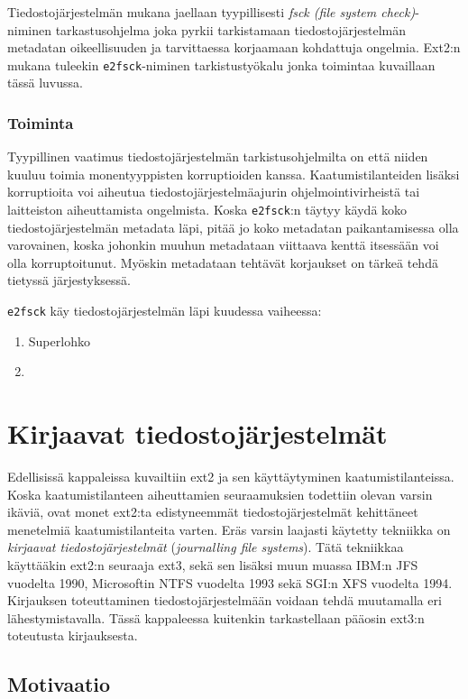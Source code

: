 Tiedostojärjestelmän mukana jaellaan tyypillisesti \emph{fsck (file system check)}-niminen tarkastusohjelma joka pyrkii tarkistamaan tiedostojärjestelmän metadatan oikeellisuuden ja tarvittaessa korjaamaan kohdattuja ongelmia.
Ext2:n mukana tuleekin \texttt{e2fsck}-niminen tarkistustyökalu jonka toimintaa kuvaillaan tässä luvussa.

\subsubsection{Toiminta}

Tyypillinen vaatimus tiedostojärjestelmän tarkistusohjelmilta on että niiden kuuluu toimia monentyyppisten korruptioiden kanssa.
Kaatumistilanteiden lisäksi korruptioita voi aiheutua tiedostojärjestelmäajurin ohjelmointivirheistä tai laitteiston aiheuttamista ongelmista.
Koska \texttt{e2fsck}:n täytyy käydä koko tiedostojärjestelmän metadata läpi,
pitää jo koko metadatan paikantamisessa olla varovainen,
koska johonkin muuhun metadataan viittaava kenttä itsessään voi olla korruptoitunut.
Myöskin metadataan tehtävät korjaukset on tärkeä tehdä tietyssä järjestyksessä.

\texttt{e2fsck} käy tiedostojärjestelmän läpi kuudessa vaiheessa:
\begin{enumerate}
    \item{Superlohko}
    \item{}
\end{enumerate}

\section{Kirjaavat tiedostojärjestelmät}
Edellisissä kappaleissa kuvailtiin ext2 ja sen käyttäytyminen kaatumistilanteissa.
Koska kaatumistilanteen aiheuttamien seuraamuksien todettiin olevan varsin ikäviä,
ovat monet ext2:ta edistyneemmät tiedostojärjestelmät kehittäneet menetelmiä kaatumistilanteita varten.
Eräs varsin laajasti käytetty tekniikka on \emph{kirjaavat tiedostojärjestelmät} (\emph{journalling file systems}).
Tätä tekniikkaa käyttääkin ext2:n seuraaja ext3, sekä sen lisäksi
muun muassa IBM:n JFS vuodelta 1990, Microsoftin NTFS vuodelta 1993 sekä SGI:n XFS vuodelta 1994.
Kirjauksen toteuttaminen tiedostojärjestelmään voidaan tehdä muutamalla eri lähestymistavalla.
Tässä kappaleessa kuitenkin tarkastellaan pääosin ext3:n toteutusta kirjauksesta.

\subsection{Motivaatio}

